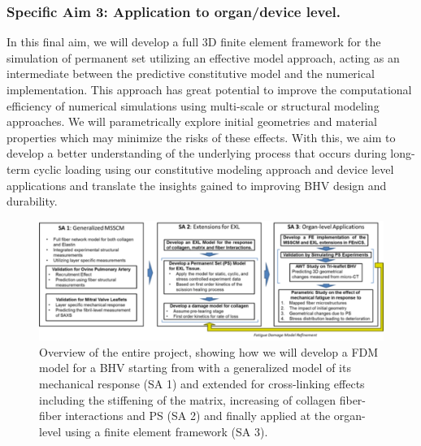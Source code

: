     
    
    \subsubsection*{Specific Aim 3: Application to organ/device level.} In this final aim, we will develop a full 3D finite element framework for the simulation of permanent set utilizing an effective model approach, acting as an intermediate between the predictive constitutive model and the numerical implementation. This approach has great potential to improve the computational efficiency of numerical simulations using multi-scale or structural modeling approaches. We will parametrically explore initial geometries and material properties which may minimize the risks of these effects. With this, we aim to develop a better understanding of the underlying process that occurs during long-term cyclic loading using our constitutive modeling approach and device level applications and translate the insights gained to improving BHV design and durability. 

    
    
\begin{figure}
\centering
\includegraphics[width=\textwidth]{Images/chapter1/specificaims.pdf}
\caption{Overview of the entire project, showing how we will develop a FDM model for a BHV starting from with a generalized model of its mechanical response (SA 1) and extended for cross-linking effects including the stiffening of the matrix, increasing of collagen fiber-fiber interactions and PS (SA 2) and finally applied at the organ-level using a finite element framework (SA  3).}
\label{c1:fig:specificaims}
\end{figure}
